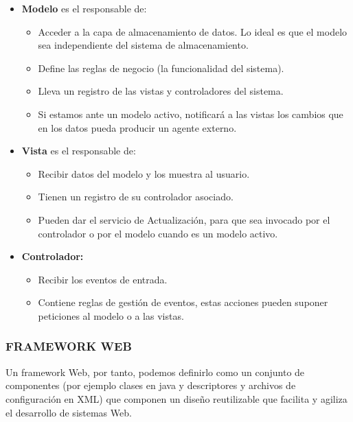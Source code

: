 \begin{itemize} 

\item \textbf{Modelo} es el responsable de:\\

\begin{itemize}
 \item Acceder a la capa de almacenamiento de datos. Lo ideal es que el modelo sea independiente del sistema de almacenamiento.
 \item Define las reglas de negocio (la funcionalidad del sistema).
 \item Lleva un registro de las vistas y controladores del sistema.
 \item Si estamos ante un modelo activo, notificará a las vistas los cambios que en los datos pueda producir un agente externo.\\
\end{itemize}

\item \textbf{Vista} es el responsable de:\\

\begin{itemize}
 \item Recibir datos del modelo y los muestra al usuario.
 \item Tienen un registro de su controlador asociado.
 \item Pueden dar el servicio de Actualización, para que sea invocado por el controlador o por el modelo cuando es un modelo activo.\\
\end{itemize}


\item \textbf{Controlador:}\\

\begin{itemize}
 \item Recibir los eventos de entrada.
 \item Contiene reglas de gestión de eventos, estas acciones pueden suponer peticiones al modelo o a las vistas.\\
\end{itemize}

\end{itemize}



\subsubsection{FRAMEWORK WEB}
Un framework Web, por tanto, podemos definirlo como un conjunto de
componentes (por ejemplo clases en java y descriptores y archivos de configuración en
XML) que componen un diseño reutilizable que facilita y agiliza el desarrollo de
sistemas Web.\\



